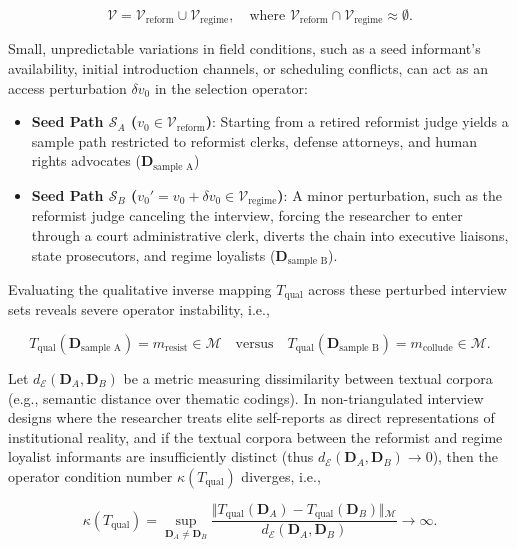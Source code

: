 \documentclass{article}
\theoremstyle{definition}
\begin{document}
\begin{equation}
\mathcal{V} = \mathcal{V}_{\text{reform}} \cup \mathcal{V}_{\text{regime}}, \quad \text{where } \mathcal{V}_{\text{reform}} \cap \mathcal{V}_{\text{regime}} \approx \emptyset.
\end{equation}

\noindent
Small, unpredictable variations in field conditions, such as a seed informant’s availability, initial introduction channels, or scheduling conflicts, can act as an access perturbation $\delta v_0$ in the selection operator:

\begin{itemize}
    \item \textbf{Seed Path $\mathcal{S}_A$ ($v_0 \in \mathcal{V}_{\text{reform}}$)}: Starting from a retired reformist judge yields a sample path restricted to reformist clerks, defense attorneys, and human rights advocates ($\mathbf{D}_{\text{sample A}}$)
    \item \textbf{Seed Path $\mathcal{S}_B$ ($v_0' = v_0 + \delta v_0 \in \mathcal{V}_{\text{regime}}$)}: A minor perturbation, such as the reformist judge canceling the interview, forcing the researcher to enter through a court administrative clerk, diverts the chain into executive liaisons, state prosecutors, and regime loyalists ($\mathbf{D}_{\text{sample B}}$).
\end{itemize}

\noindent
Evaluating the qualitative inverse mapping $T_{\text{qual}}$ across these perturbed interview sets reveals severe operator instability, i.e., 

\[
T_{\text{qual}}(\mathbf{D}_{\text{sample A}}) = m_{\text{resist}} \in \mathcal{M} \quad \text{versus} \quad T_{\text{qual}}(\mathbf{D}_{\text{sample B}}) = m_{\text{collude}} \in \mathcal{M}.
\]

\noindent
Let $d_{\mathcal{E}}(\mathbf{D}_A, \mathbf{D}_B)$ be a metric measuring dissimilarity between textual corpora (e.g., semantic distance over thematic codings). In non-triangulated interview designs where the researcher treats elite self-reports as direct representations of institutional reality, and if the textual corpora between the reformist and regime loyalist informants are insufficiently distinct (thus $d_{\mathcal{E}}(\mathbf{D}_A, \mathbf{D}_B) \rightarrow 0$), then the operator condition number $\kappa(T_{\text{qual}})$ diverges, i.e., 

\begin{equation}
\kappa(T_{\text{qual}}) = \sup_{\mathbf{D}_A \neq \mathbf{D}_B} \frac{\Vert{}T_{\text{qual}}(\mathbf{D}_A) - T_{\text{qual}}(\mathbf{D}_B)\Vert{}_\mathcal{M}}{d_{\mathcal{E}}(\mathbf{D}_A, \mathbf{D}_B)} \to \infty.
\end{equation}
\end{document}
